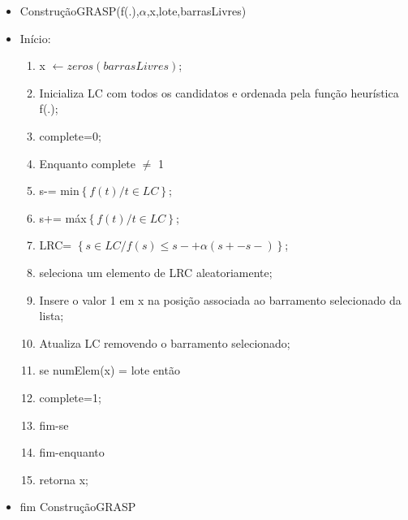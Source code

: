 \documentclass[12pt]{article}
\begin{document}
 \begin{itemize}
 	\item ConstruçãoGRASP(f(.),$\alpha$,x,lote,barrasLivres)
 	\item Início:
 	\begin{enumerate}
 		\item x $\leftarrow zeros(barrasLivres)$; 
 		\item Inicializa LC com todos os candidatos e ordenada pela função heurística f(.);
 		\item complete=0;
 		\item Enquanto complete $\neq$ 1
 		\item \quad s-= min$\left \{f(t)/t \in LC \right \}$; 
 		\item \quad s+= máx$\left \{f(t)/t \in LC \right \}$; 
 		\item \quad LRC= $\left \{s \in LC/f(s) \leq s- +\alpha(s+ - s-) \right \}$;
 		\item \quad seleciona um elemento de LRC aleatoriamente;
 		\item \quad Insere o valor 1 em x na posição associada ao barramento selecionado da lista;
 		\item \quad Atualiza LC removendo o barramento selecionado;
 		\item \quad se numElem(x) = lote então
 		\item \qquad complete=1;
 		\item \quad fim-se
 		\item fim-enquanto
 		\item retorna x;
 	\end{enumerate}	
 	\item fim ConstruçãoGRASP
 \end{itemize}
\end{document}
